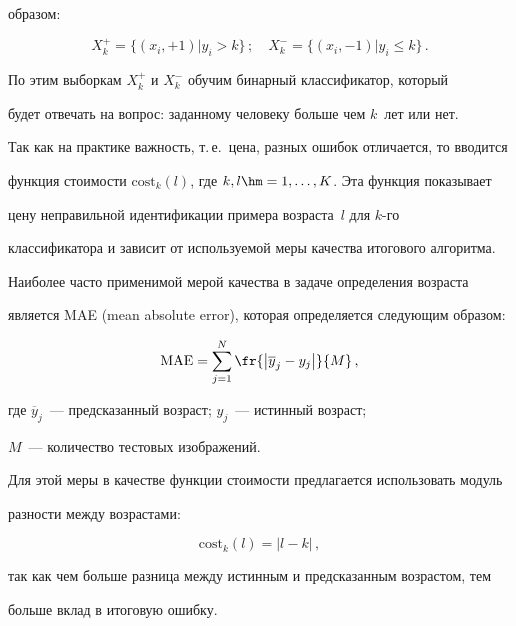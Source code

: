 образом:

\begin{equation}

X_k^+=\{(x_i,+1)\vert y_i>k\}\,;\quad X_k^- =\{(x_i,-1)\vert y_i\leq k\}\,.

\label{e1-r}

\end{equation}



По этим выборкам $X_k^+$ и $X_k^-$ обучим бинарный классификатор, который

будет отвечать на вопрос: заданному человеку больше чем $k$~лет или нет.



Так как на практике важность, т.\,е.\ цена, разных ошибок отличается, то вводится

функция стоимости $\mathrm{cost}_k(l)$, где $k,l\hm=1,\ldots ,K$. Эта функция показывает

цену неправильной идентификации примера возраста~$l$ для $k$-го

классификатора и зависит от используемой меры качества итогового алгоритма.



Наиболее часто применимой мерой качества в задаче определения возраста

является MAE (mean absolute error), которая определяется следующим образом:

$$

\mathrm{MAE}=\sum\limits_{j=1}^N \fr{\left\vert \overline{y}_j-y_j\right\vert}{ M}\,,

$$

где $\overline{y}_j$~--- предсказанный возраст; $y_j$~--- истинный возраст;

$M$~--- количество тестовых изображений.



Для этой меры в качестве функции стоимости предлагается использовать модуль

разности между возрастами:

\begin{equation}

\mathrm{cost}_k(l)=\vert l-k\vert\,,

\label{e2-r}

\end{equation}

так как чем больше разница между истинным и предсказанным возрастом, тем

больше вклад в итоговую ошибку.



